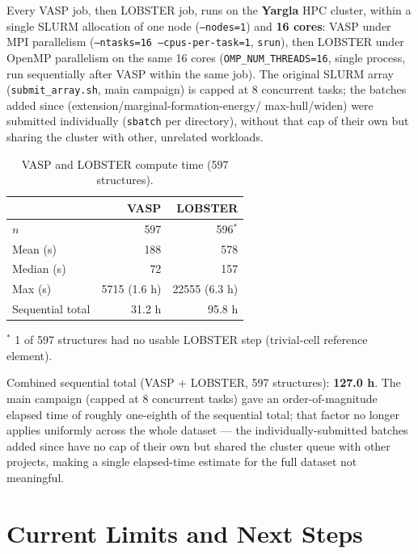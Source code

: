 \documentclass[11pt,a4paper]{article}
\begin{document}
Every VASP job, then LOBSTER job, runs on the \textbf{Yargla} HPC cluster,
within a single SLURM allocation of one node (\texttt{--nodes=1}) and
\textbf{16 cores}: VASP under MPI parallelism
(\texttt{--ntasks=16 --cpus-per-task=1}, \texttt{srun}), then LOBSTER
under OpenMP parallelism on the same 16 cores
(\texttt{OMP\_NUM\_THREADS=16}, single process, run sequentially after
VASP within the same job). The original SLURM array
(\texttt{submit\_array.sh}, main campaign) is capped at 8 concurrent
tasks; the batches added since (extension/marginal-formation-energy/
max-hull/widen) were submitted individually (\texttt{sbatch} per
directory), without that cap of their own but sharing the cluster with
other, unrelated workloads.

\begin{table}[htbp]
\centering
\caption{VASP and LOBSTER compute time (597 structures).}
\label{tab:compute-cost}
\begin{tabular}{@{}lrr@{}}
\toprule
 & VASP & LOBSTER \\
\midrule
$n$ & 597 & 596$^*$ \\
Mean (s) & 188 & 578 \\
Median (s) & 72 & 157 \\
Max (s) & 5715 (1.6 h) & 22555 (6.3 h) \\
Sequential total & 31.2 h & 95.8 h \\
\bottomrule
\end{tabular}

\vspace{0.15cm}
{\footnotesize $^*$ 1 of 597 structures had no usable LOBSTER step
(trivial-cell reference element).}
\end{table}

Combined sequential total (VASP + LOBSTER, 597 structures):
\textbf{127.0 h}. The main campaign (capped at 8 concurrent tasks) gave
an order-of-magnitude elapsed time of roughly one-eighth of the
sequential total; that factor no longer applies uniformly across the
whole dataset --- the individually-submitted batches added since have no
cap of their own but shared the cluster queue with other projects,
making a single elapsed-time estimate for the full dataset not
meaningful.

\section{Current Limits and Next Steps}
\label{sec:limits-current}
\end{document}
